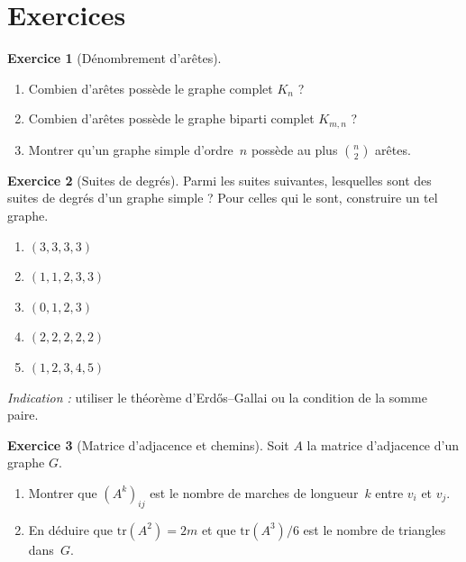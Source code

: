 \documentclass[12pt,a4paper,openany]{book}
\theoremstyle{definition}
\newtheorem{exercice}{Exercice}[chapter]
\theoremstyle{plain}
\theoremstyle{remark}
\begin{document}
\section{Exercices}
\label{sec:graphes-exercices}

\begin{exercice}[Dénombrement d'arêtes]
\label{exo:aretes}
\begin{enumerate}[label=(\alph*)]
  \item Combien d'arêtes possède le graphe complet $K_n$ ?
  \item Combien d'arêtes possède le graphe biparti complet $K_{m,n}$ ?
  \item Montrer qu'un graphe simple d'ordre~$n$ possède au plus
    $\binom{n}{2}$ arêtes.
\end{enumerate}
\end{exercice}

\begin{exercice}[Suites de degrés]
\label{exo:suites-degres}
Parmi les suites suivantes, lesquelles sont des suites de degrés d'un graphe
simple ? Pour celles qui le sont, construire un tel graphe.
\begin{enumerate}[label=(\alph*)]
  \item $(3, 3, 3, 3)$
  \item $(1, 1, 2, 3, 3)$
  \item $(0, 1, 2, 3)$
  \item $(2, 2, 2, 2, 2)$
  \item $(1, 2, 3, 4, 5)$
\end{enumerate}
\textit{Indication :} utiliser le théorème d'Erd\H{o}s--Gallai ou la condition de la somme paire.
\end{exercice}

\begin{exercice}[Matrice d'adjacence et chemins]
\label{exo:matrice-chemins}
Soit $A$ la matrice d'adjacence d'un graphe $G$.
\begin{enumerate}[label=(\alph*)]
  \item Montrer que $(A^k)_{ij}$ est le nombre de marches de longueur~$k$
    entre $v_i$ et $v_j$.
  \item En déduire que $\mathrm{tr}(A^2) = 2m$ et que $\mathrm{tr}(A^3)/6$
    est le nombre de triangles dans~$G$.
\end{enumerate}
\end{exercice}
\end{document}

